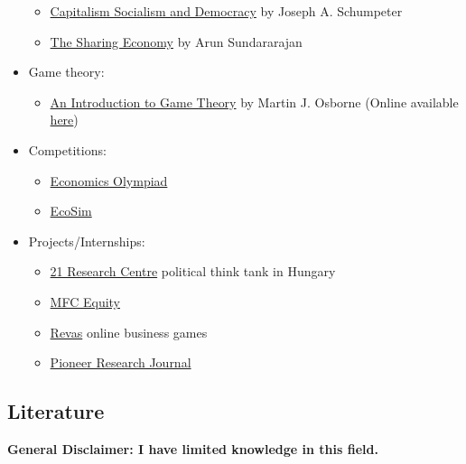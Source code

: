 \documentclass{article}
\begin{document}
\begin{itemize}
\begin{itemize}
        \item \href{https://www.goodreads.com/book/show/134798.Capitalism_Socialism_and_Democracy}{Capitalism Socialism and Democracy} by Joseph A. Schumpeter

        \item \href{https://www.goodreads.com/book/show/27310516-the-sharing-economy}{The Sharing Economy} by Arun Sundararajan
    \end{itemize}
    \item Game theory:
    \begin{itemize}
        \item \href{https://www.goodreads.com/book/show/469855.An_Introduction_to_Game_Theory}{An Introduction to Game Theory} by Martin J. Osborne (Online available \href{https://mathematicalolympiads.wordpress.com/wp-content/uploads/2012/08/martin_j-_osborne-an_introduction_to_game_theory-oxford_university_press_usa2003.pdf}{here})
    \end{itemize}
    \item Competitions:
    \begin{itemize}
        \item \href{https://economicsolympiad.org/}{Economics Olympiad}
        \item \href{https://www.ecosim.hu/}{EcoSim}
    \end{itemize}
    \item Projects/Internships:
    \begin{itemize}
        \item \href{https://21kutatokozpont.hu/index.html}{21 Research Centre} political think tank in Hungary
        \item \href{https://mfcequity.com/}{MFC Equity}
        \item \href{https://www.revas.online/en/}{Revas} online business games
        \item \href{https://pioneeracademics.com/journals/}{Pioneer Research Journal}
    \end{itemize}
\end{itemize}

\subsection{Literature}
\textbf{General Disclaimer: I have limited knowledge in this field.}
\end{document}
